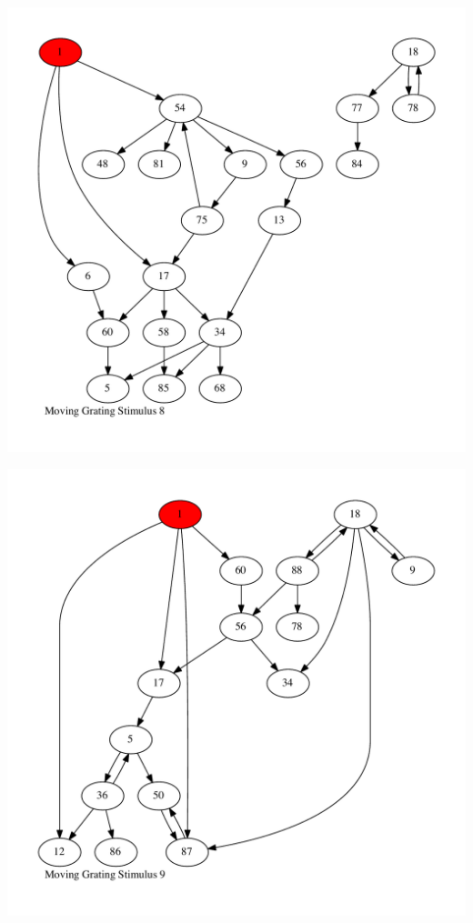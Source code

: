 \documentclass{article}
\begin{document}
\newpage
\includegraphics[max height=\textheight,max width=\textwidth]{stim_mov_grat/stim8_pp.pdf}

\newpage
\includegraphics[max height=\textheight,max width=\textwidth]{stim_mov_grat/stim9_pp.pdf}
\end{document}
